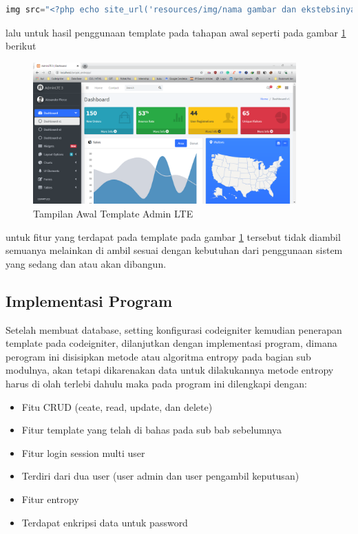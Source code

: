 \begin{lstlisting}[language=PHP]
img src="<?php echo site_url('resources/img/nama gambar dan ekstebsinya); ?>"  
\end{lstlisting}

lalu untuk hasil penggunaan template pada tahapan awal seperti pada gambar \ref{tmp5} berikut

\begin{figure}[!htbp]
	\centerline{\includegraphics[width=0.90\textwidth]{figures/tmp/4.png}}
	\caption{Tampilan Awal Template Admin LTE}
	\label{tmp5}
\end{figure}

untuk fitur yang terdapat pada template pada gambar \ref{tmp5} tersebut tidak diambil semuanya melainkan di ambil sesuai dengan kebutuhan dari penggunaan sistem yang sedang dan atau akan dibangun.

\subsection{Implementasi Program}

Setelah membuat database, setting konfigurasi codeigniter kemudian penerapan template pada codeigniter, dilanjutkan dengan implementasi program, dimana perogram ini disisipkan metode atau algoritma entropy pada bagian sub modulnya, akan tetapi dikarenakan data untuk dilakukannya metode entropy harus di olah terlebi dahulu maka pada program ini dilengkapi dengan:
\begin{itemize}
\item Fitu CRUD (ceate, read, update, dan delete)
\item Fitur template yang telah di bahas pada sub bab sebelumnya 
\item Fitur login session multi user
\item Terdiri dari dua user (user admin dan user pengambil keputusan)
\item Fitur entropy
\item Terdapat enkripsi data untuk password
\end{itemize}

